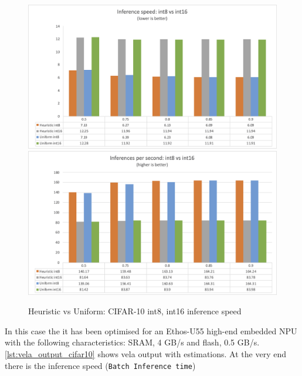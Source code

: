 \begin{figure}
    \centering
    {\includegraphics[width=1\linewidth]{images/experiments/cifar10_inf_speed.png}}
    {\includegraphics[width=1\linewidth]{images/experiments/cifar10_infs_second.png}}
    \caption{Heuristic vs Uniform: CIFAR-10 int8, int16 inference speed}\label{fig:cifar10_inf_speed}
\end{figure}

In this case the it has been optimised for an Ethos-U55 high-end embedded NPU
with the following characteristics: SRAM, 4 GB/s and flash, 0.5 GB/s.
\autoref{lst:vela_output_cifar10} shows vela output with estimations. At the very end
there is the inference speed (\texttt{Batch Inference time})

